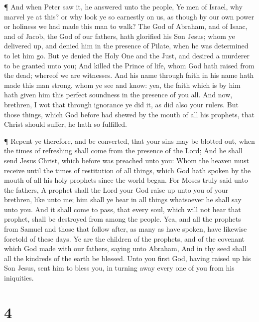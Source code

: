  ¶ And when Peter saw it, he answered unto the people, Ye
men of Israel, why marvel ye at this? or why look ye so earnestly on us,
as though by our own power or holiness we had made this man to walk?
 The God of Abraham, and of Isaac, and of Jacob, the God of
our fathers, hath glorified his Son Jesus; whom ye delivered up, and
denied him in the presence of Pilate, when he was determined to let him
go.  But ye denied the Holy One and the Just, and desired a
murderer to be granted unto you;  And killed the Prince of
life, whom God hath raised from the dead; whereof we are witnesses.
 And his name through faith in his name hath made this man
strong, whom ye see and know: yea, the faith which is by him hath given
him this perfect soundness in the presence of you all.  And
now, brethren, I wot that through ignorance ye did it, as did also your
rulers.  But those things, which God before had shewed by
the mouth of all his prophets, that Christ should suffer, he hath so
fulfilled.

 ¶ Repent ye therefore, and be converted, that your sins
may be blotted out, when the times of refreshing shall come from the
presence of the Lord;  And he shall send Jesus Christ,
which before was preached unto you:  Whom the heaven must
receive until the times of restitution of all things, which God hath
spoken by the mouth of all his holy prophets since the world began.
 For Moses truly said unto the fathers, A prophet shall the
Lord your God raise up unto you of your brethren, like unto me; him
shall ye hear in all things whatsoever he shall say unto you.
 And it shall come to pass, that every soul, which will not
hear that prophet, shall be destroyed from among the people.
 Yea, and all the prophets from Samuel and those that
follow after, as many as have spoken, have likewise foretold of these
days.  Ye are the children of the prophets, and of the
covenant which God made with our fathers, saying unto Abraham, And in
thy seed shall all the kindreds of the earth be blessed. 
Unto you first God, having raised up his Son Jesus, sent him to bless
you, in turning away every one of you from his iniquities.

\hypertarget{section-3}{%
\section{4}\label{section-3}}


